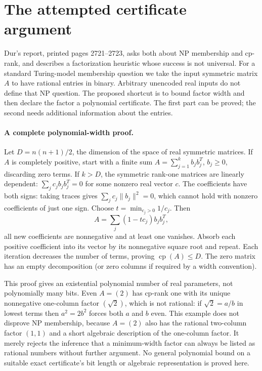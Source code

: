 \documentclass[11pt]{article}
\begin{document}
\section{The attempted certificate argument}
Dur's report, printed pages 2721--2723, asks both about NP membership and
cp-rank, and describes a factorization heuristic whose success is not universal.
For a standard Turing-model membership question we take the input symmetric
matrix $A$ to have rational entries in binary. Arbitrary unencoded real inputs
do not define that NP question. The proposed shortcut is to bound factor
width and then declare the factor a polynomial certificate. The first part
can be proved; the second needs additional information about the entries.

\paragraph{A complete polynomial-width proof.}
Let $D=n(n+1)/2$, the dimension of the space of real symmetric matrices.
If $A$ is completely positive, start with a finite sum
$A=\sum_{j=1}^k b_jb_j^T$, $b_j\ge0$, discarding zero terms.
If $k>D$, the symmetric rank-one matrices are linearly dependent:
$\sum_j c_jb_jb_j^T=0$ for some nonzero real vector $c$.
The coefficients have both signs: taking traces gives
$\sum_jc_j\|b_j\|^2=0$, which cannot hold with nonzero coefficients of
just one sign. Choose $t=\min_{c_j>0}1/c_j$. Then
\[
A=\sum_j(1-tc_j)b_jb_j^T,
\]
all new coefficients are nonnegative and at least one vanishes. Absorb each
positive coefficient into its vector by its nonnegative square root and
repeat. Each iteration decreases the number of terms, proving
$\operatorname{cp}(A)\le D$. The zero matrix has an empty decomposition
(or zero columns if required by a width convention).

This proof gives an existential polynomial number of real parameters, not
polynomially many bits. Even $A=(2)$ has cp-rank one with its unique
nonnegative one-column factor $(\sqrt2)$, which is not rational: if
$\sqrt2=a/b$ in lowest terms then $a^2=2b^2$ forces both $a$ and $b$ even.
This example does not disprove NP membership, because $A=(2)$ also has the
rational two-column factor $(1,1)$ and a short algebraic description of the
one-column factor. It merely rejects the inference that a minimum-width
factor can always be listed as rational numbers without further argument.
No general polynomial bound on a suitable exact certificate's bit length
or algebraic representation is proved here.
\end{document}
